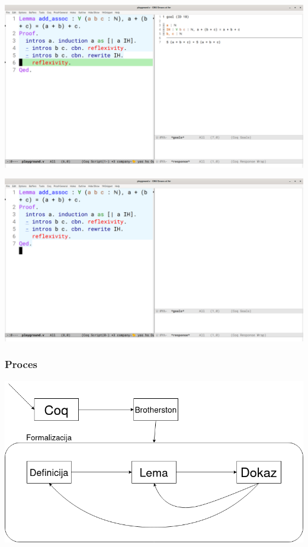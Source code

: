 \documentclass{beamer}
\begin{document}
\begin{frame}[plain]
  \includegraphics[width=\linewidth]{slika13}
\end{frame}\addtocounter{framenumber}{-1}
\begin{frame}[plain]
  \includegraphics[width=\linewidth]{slika15}
\end{frame}\addtocounter{framenumber}{-1}

  
\begin{frame}
  \frametitle{Proces}
  \includegraphics[width=\textwidth]{diplomskiproces.png}
\end{frame}
\end{document}

